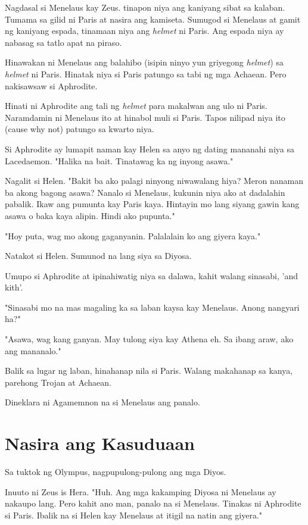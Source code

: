 \documentclass[12pt,letterpaper]{report}
\begin{document}
Nagdasal si Menelaus kay Zeus. tinapon niya ang kaniyang sibat sa kalaban. Tumama sa gilid ni Paris at nasira ang kamiseta.
Sumugod si Menelaus at gamit ng kaniyang espada, tinamaan niya ang \textit{helmet} ni Paris.
Ang espada niya ay nabasag sa tatlo apat na piraso.

Hinawakan ni Menelaus ang balahibo (isipin ninyo yun griyegong \textit{helmet}) sa \textit{helmet} ni Paris.
Hinatak niya si Paris patungo sa tabi ng mga Achaean. Pero nakisawsaw si Aphrodite.

Hinati ni Aphrodite ang tali ng \textit{helmet} para makalwan ang ulo ni Paris. Naramdamin ni Menelaus ito at hinabol muli si Paris.
Tapos nilipad niya ito (cause why not) patungo sa kwarto niya.

Si Aphrodite ay lumapit naman kay Helen sa anyo ng dating mananahi niya sa Lacedaemon. "Halika na bait.
Tinatawag ka ng inyong asawa."

Nagalit si Helen. "Bakit ba ako palagi ninyong niwawalang hiya? Meron nanaman ba akong bagong asawa?
Nanalo si Menelaus, kukunin niya ako at dadalahin pabalik. Ikaw ang pumunta kay Paris kaya.
Hintayin mo lang siyang gawin kang asawa o baka kaya alipin. Hindi ako pupunta."

"Hoy puta, wag mo akong gaganyanin. Palalalain ko ang giyera kaya."

Natakot si Helen. Sumunod na lang siya sa Diyosa.

Umupo si Aphrodite at ipinahiwatig niya sa dalawa, kahit walang sinasabi, 'and kith'.

"Sinasabi mo na mas magaling ka sa laban kaysa kay Menelaus. Anong nangyari ha?"

"Asawa, wag kang ganyan. May tulong siya kay Athena eh. Sa ibang araw, ako ang mananalo."

Balik sa lugar ng laban, hinahanap nila si Paris. Walang makahanap sa kanya, parehong Trojan at Achaean.

Dineklara ni Agamemnon na si Menelaus ang panalo.


\pagebreak

\chapter{Nasira ang Kasuduaan}
Sa tuktok ng Olympus, nagpupulong-pulong ang mga Diyos.

Inuuto ni Zeus is Hera. "Huh. Ang mga kakamping Diyosa ni Menelaus ay nakaupo lang.
Pero kahit ano man, panalo na si Menelaus. Tinakas ni Aphrodite si Paris.
Ibalik na si Helen kay Menelaus at itigil na natin ang giyera."
\end{document}
